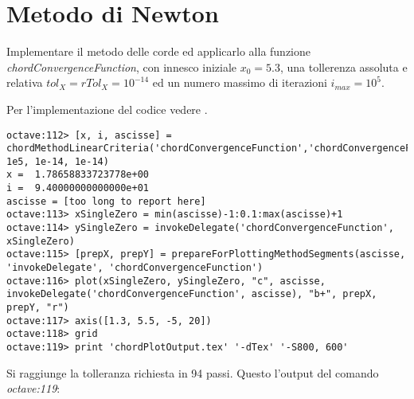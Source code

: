 \section{Metodo di Newton}
\label{sec:metodoDiNewton}

\begin{exercise}
Implementare il metodo delle corde ed applicarlo alla funzione
\emph{chordConvergenceFunction}, con innesco iniziale $x_{0} = 5.3$, una tollerenza assoluta e relativa
$tol_{X} = rTol_{X} = 10^{-14}$ ed un numero massimo di iterazioni
$i_{max} = 10^{5}$.
\end{exercise}
Per l'implementazione del codice vedere .
\begin{lstlisting}
octave:112> [x, i, ascisse] =
chordMethodLinearCriteria('chordConvergenceFunction','chordConvergenceFunctionDerivative',5.3, 1e5, 1e-14, 1e-14) 
x =  1.78658833723778e+00
i =  9.40000000000000e+01
ascisse = [too long to report here]
octave:113> xSingleZero = min(ascisse)-1:0.1:max(ascisse)+1
octave:114> ySingleZero = invokeDelegate('chordConvergenceFunction', xSingleZero)
octave:115> [prepX, prepY] = prepareForPlottingMethodSegments(ascisse, 'invokeDelegate', 'chordConvergenceFunction')
octave:116> plot(xSingleZero, ySingleZero, "c", ascisse, invokeDelegate('chordConvergenceFunction', ascisse), "b+", prepX, prepY, "r")
octave:117> axis([1.3, 5.5, -5, 20])
octave:118> grid
octave:119> print 'chordPlotOutput.tex' '-dTex' '-S800, 600'
\end{lstlisting}
Si raggiunge la tolleranza richiesta in 94 passi. Questo l'output del comando
\emph{octave:119}:
\begin{center}

\end{center}


